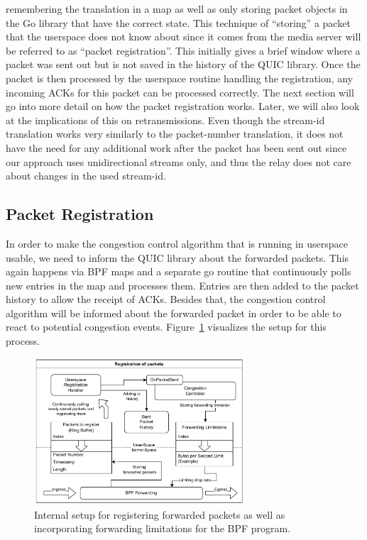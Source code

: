 remembering the translation in a map as well as only storing packet objects in the 
Go library that have the correct state.
This technique of ``storing'' a packet that the userspace does not know
about since it comes from the media server will be referred to as ``packet registration''.
This initially gives a brief window where a packet was sent out but is not saved in the history
of the QUIC library.
Once the packet is then processed by the userspace routine handling the 
registration, any incoming ACKs for this packet can be processed correctly.
The next section will go into more detail on how the packet registration works.
Later, we will also look at the implications of this on retransmissions.
Even though the stream-id translation works very similarly to the packet-number translation, it 
does not have the need for any additional work after the packet has been sent out since our 
approach uses unidirectional streams only, and thus the relay does not care about changes in 
the used stream-id. %

\subsection{Packet Registration}
In order to make the congestion control algorithm that is running in userspace
usable, we need to inform the QUIC library about the forwarded packets.
This again happens via BPF maps and a separate go routine that continuously
polls new entries in the map and processes them.
Entries are then added to the packet history to allow the receipt of ACKs.
Besides that, the congestion control algorithm will be informed about the
forwarded packet in order to be able to react to potential congestion events.
Figure~\ref{fig:forward-registration} visualizes the setup for this process.
\vspace{0.5cm}
\begin{figure}[H]
    \centering
    \includegraphics[width=0.7\textwidth]{figures/03_fast_relays/forward-registration.drawio.pdf}
    \caption[Packet registration schematic]{Internal setup for registering forwarded packets as well as incorporating forwarding
    limitations for the BPF program.}\label{fig:forward-registration}
\end{figure}

